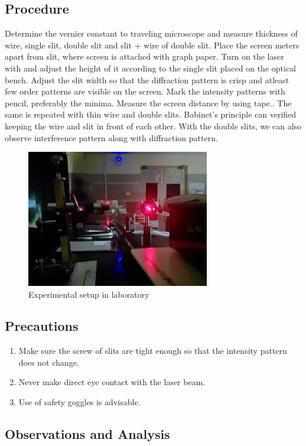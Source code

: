 \documentclass[a4paper, amsfonts, amssymb, amsmath, reprint, showkeys, nofootinbib, twoside]{revtex4-1}
\begin{document}
\subsection{Procedure}
Determine the vernier constant to traveling microscope and measure thickness of wire, single slit, double slit and slit + wire of double slit. Place the screen meters apart from slit, where screen is attached with graph paper. Turn on the laser with and adjust the height of it according to the single  slit placed on the optical bench. Adjust the slit width so that the diffraction pattern is crisp and atleast few order patterns are visible on the screen. Mark the intensity patterns with pencil, preferably the minima. Measure the screen distance by using tape.. The same is repeated with thin wire and double slits. Babinet's principle can verified keeping the wire and slit in front of each other. With the double slits, we can also observe interference pattern along with diffraction pattern.

\begin{figure}[htbp] %
	\centering
	\includegraphics[width=8cm]{1} 
	\caption{Experimental setup in laboratory}
\end{figure}

\subsection{Precautions}
\begin{enumerate}
\item{Make sure the screw of slits are tight enough so that the intensity pattern does not change.}
\item{Never make direct eye contact with the laser beam.}
\item{Use of safety goggles is advisable.}
\end{enumerate}

\subsection{Observations and Analysis}
\end{document}
